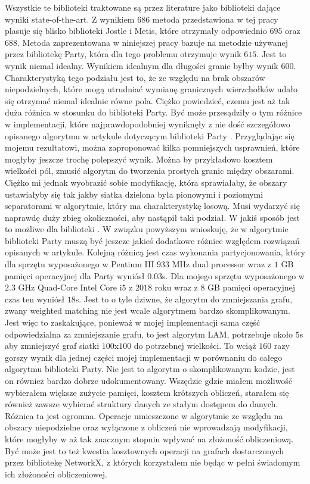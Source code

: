 Wszystkie te biblioteki traktowane są przez literature jako biblioteki dające wyniki state-of-the-art.
Z wynikiem $686$ metoda przedstawiona w tej pracy plasuje się blisko biblioteki Jostle i Metis,
które otrzymały odpowiednio $695$ oraz $688$.
Metoda zaprezentowana w niniejszej pracy bazuje na metodzie używanej przez bibliotekę Party, która dla tego problemu
otrzymuje wynik $615$.
Jest to wynik niemal idealny.
Wynikiem idealnym dla długości granic byłby wynik $600$.
Charakterystyką tego podziału jest to, że ze względu na brak obszarów niepodzielnych, które mogą utrudniać
wymianę granicznych wierzchołków udało się otrzymać niemal idealnie równe pola.
Ciężko powiedzieć, czemu jest aż tak duża różnica w stosunku do biblioteki Party.
Być może przesądziły o tym różnice w implementacji, które najprawdopodobniej wyniknęły z nie dość szczegółowo opisanego algorytmu
w artykule dotyczącym biblioteki Party \cite{1364754}.
Przyglądając się mojemu rezultatowi, można zaproponować kilka pomniejszych usprawnień, które mogłyby jeszcze trochę polepszyć wynik.
Można by przykładowo kosztem wielkości pól, zmusić algorytm do tworzenia prostych granic między obszarami.
Ciężko mi jednak wyobrazić sobie modyfikację, która sprawiałaby, że obszary ustawiałyby się tak jakby siatka dzielona
była pionowymi i poziomymi separatorami w algorytmie, który ma charakterystykę losową.
Musi wydarzyć się naprawdę duży zbieg okoliczności, aby nastąpił taki podział.
W jakiś sposób jest to możliwe dla biblioteki \cite{1364754}.
W związku powyższym wnioskuję, że w algorytmie biblioteki Party \cite{1364754} muszą być jeszcze jakieś dodatkowe
różnice względem rozwiązań opisanych w artykule.
Kolejną różnicą jest czas wykonania partycjonowania, który dla sprzętu wyposażonego w Pentium III $933$ MHz dual processor
wraz z $1$ GB pamięci operacyjnej dla Party wyniósł $0.03$s.
Dla mojego sprzętu wyposażonego w $2.3$ GHz Quad-Core Intel Core i$5$ z $2018$ roku wraz z $8$ GB pamięci operacyjnej
czas ten wyniósł $18$s.
Jest to o tyle dziwne, że algorytm do zmniejszania grafu, zwany weighted matching nie jest wcale algorytmem bardzo skomplikowanym.
Jest więc to zaskakujące, ponieważ w mojej implementacji sama część odpowiedzialna za zmniejszanie grafu, to jest algorytm LAM,
potrzebuje około $5$s aby zmniejszyć graf siatki $100$x$100$ do potrzebnej wielkości.
To wciąż $160$ razy gorszy wynik dla jednej części mojej implementacji w porównaniu do całego algorytmu biblioteki
Party.
Nie jest to algorytm o skomplikowanym kodzie, jest on również bardzo dobrze udokumentowany.
Wszędzie gdzie miałem możliwość wybierałem większe zużycie pamięci, kosztem krótszych obliczeń, starałem się również
zawsze wybierać struktury danych ze stałym dostępem do danych.
Różnica ta jest ogromna.
Operacje umieszczone w algorytmie ze względu na obszary niepodzielne oraz wyłączone z obliczeń nie wprowadzają
modyfikacji, które mogłyby w aż tak znacznym stopniu wpływać na złożoność obliczeniową.
Być może jest to też kwestia kosztownych operacji na grafach dostarczonych przez bibliotekę NetworkX,
z których korzystałem nie będąc w pełni świadomym ich złożoności obliczeniowej.

